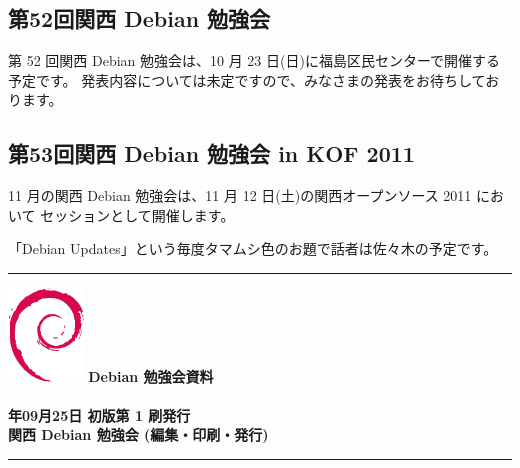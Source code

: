 \documentclass[mingoth,a4paper]{jsarticle}
\newcommand{\debmtgyear}{2011}
\newcommand{\debmtgmonth}{09}
\newcommand{\debmtgdate}{25}
\begin{document}
\clearpage

\subsection{第52回関西 Debian 勉強会}

第 52 回関西 Debian 勉強会は、10 月 23 日(日)に福島区民センターで開催する予定です。
発表内容については未定ですので、みなさまの発表をお待ちしております。

\subsection{第53回関西 Debian 勉強会 in KOF 2011 }

11 月の関西 Debian 勉強会は、11 月 12 日(土)の関西オープンソース 2011 において
セッションとして開催します。

「Debian Updates」という毎度タマムシ色のお題で話者は佐々木の予定です。

\mbox{}\newpage
\mbox{}\newpage
\mbox{}\newpage

\printindex

 \begin{minipage}[b]{0.2\hsize}
 \end{minipage}
 \begin{minipage}[b]{0.8\hsize}

 \vspace*{15cm}
 \rule{\hsize}{1mm}
 \vspace{2mm}
 \includegraphics[width=2cm]{image200502/openlogo-nd.eps}
 \noindent \Large \bf Debian 勉強会資料\\ \\
 \noindent \normalfont \debmtgyear{}年\debmtgmonth{}月\debmtgdate{}日 \hspace{5mm}  初版第 1 刷発行\\
 \noindent \normalfont 関西 Debian 勉強会 (編集・印刷・発行)\\
 \rule{\hsize}{1mm}
 \end{minipage}
\end{document}
